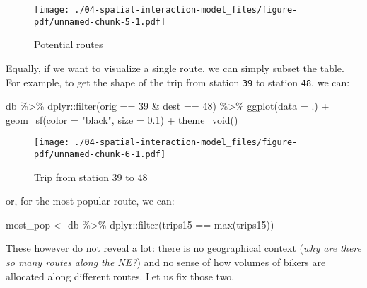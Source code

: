 \documentclass[
  letterpaper,
  krantz2]{style/krantz}
\newenvironment{Shaded}{\begin{snugshade}}{\end{snugshade}}
\newcommand{\AttributeTok}[1]{\textcolor[rgb]{0.40,0.45,0.13}{#1}}
\newcommand{\DecValTok}[1]{\textcolor[rgb]{0.68,0.00,0.00}{#1}}
\newcommand{\FloatTok}[1]{\textcolor[rgb]{0.68,0.00,0.00}{#1}}
\newcommand{\FunctionTok}[1]{\textcolor[rgb]{0.28,0.35,0.67}{#1}}
\newcommand{\NormalTok}[1]{\textcolor[rgb]{0.00,0.23,0.31}{#1}}
\newcommand{\OtherTok}[1]{\textcolor[rgb]{0.00,0.23,0.31}{#1}}
\newcommand{\SpecialCharTok}[1]{\textcolor[rgb]{0.37,0.37,0.37}{#1}}
\newcommand{\StringTok}[1]{\textcolor[rgb]{0.13,0.47,0.30}{#1}}
\begin{document}
\begin{figure}[H]

{\centering \texttt{[image: ./04-spatial-interaction-model\_files/figure-pdf/unnamed-chunk-5-1.pdf]}

}

\caption{Potential routes}

\end{figure}

Equally, if we want to visualize a single route, we can simply subset
the table. For example, to get the shape of the trip from station
\texttt{39} to station \texttt{48}, we can:

\begin{Shaded}
\begin{Highlighting}[]
\NormalTok{db }\SpecialCharTok{\%\textgreater{}\%} 
\NormalTok{  dplyr}\SpecialCharTok{::}\FunctionTok{filter}\NormalTok{(orig }\SpecialCharTok{==} \DecValTok{39} \SpecialCharTok{\&}\NormalTok{ dest }\SpecialCharTok{==} \DecValTok{48}\NormalTok{) }\SpecialCharTok{\%\textgreater{}\%} 
  \FunctionTok{ggplot}\NormalTok{(}\AttributeTok{data =}\NormalTok{ .) }\SpecialCharTok{+} 
  \FunctionTok{geom\_sf}\NormalTok{(}\AttributeTok{color =} \StringTok{"black"}\NormalTok{, }
          \AttributeTok{size =} \FloatTok{0.1}\NormalTok{) }\SpecialCharTok{+}
  \FunctionTok{theme\_void}\NormalTok{()}
\end{Highlighting}
\end{Shaded}

\begin{figure}[H]

{\centering \texttt{[image: ./04-spatial-interaction-model\_files/figure-pdf/unnamed-chunk-6-1.pdf]}

}

\caption{Trip from station 39 to 48}

\end{figure}

or, for the most popular route, we can:

\begin{Shaded}
\begin{Highlighting}[]
\NormalTok{most\_pop }\OtherTok{\textless{}{-}}\NormalTok{ db }\SpecialCharTok{\%\textgreater{}\%} 
\NormalTok{  dplyr}\SpecialCharTok{::}\FunctionTok{filter}\NormalTok{(trips15 }\SpecialCharTok{==} \FunctionTok{max}\NormalTok{(trips15))}
\end{Highlighting}
\end{Shaded}

These however do not reveal a lot: there is no geographical context
(\emph{why are there so many routes along the NE?}) and no sense of how
volumes of bikers are allocated along different routes. Let us fix those
two.
\end{document}
